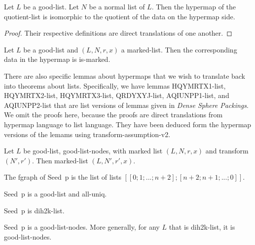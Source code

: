 \begin{lemma} 
Let $L$ be a good-list.  Let $N$ be a normal list of $L$.
Then the hypermap of the quotient-list is isomorphic to the quotient of the data
on the hypermap side.
\end{lemma}

\begin{proof} Their respective definitions are direct translations of one another.
\end{proof}

\begin{lemma} 
 Let $L$ be a good-list and $(L,N,r,x)$ a marked-list.
Then the corresponding data in the hypermap is is-marked.
\end{lemma}

There are also specific lemmas about hypermaps that we wish to translate back into theorems
about lists.  Specifically, we have lemmas HQYMRTX1-list, HQYMRTX2-list, HQYMRTX3-list,
QRDYXYJ-list, AQIUNPP1-list, and AQIUNPP2-list that are list versions of lemmas given in {\it Dense Sphere Packings}.
We omit the proofs here, because the proofs are direct translations from hypermap language to list language.
They have been deduced form the hypermap versions of the lemams using transform-assumption-v2.

\begin{lemma} 
Let $L$ be good-list, good-list-nodes, with marked list $(L,N,r,x)$ and transform $(N',r')$.
Then marked-list $(L,N',r',x)$.
\end{lemma}



The fgraph of Seed~p is the list of lists $[[0;1;...;n+2];[n+2;n+1;...;0]]$.

\begin{lemma} 
 Seed~p is a good-list and all-uniq.
\end{lemma}



\begin{lemma}
Seed~p is dih2k-list.
\end{lemma}

\begin{lemma}
Seed~p is a good-list-nodes.  More generally, for any $L$ that is dih2k-list,
it is good-list-nodes.
\end{lemma}


